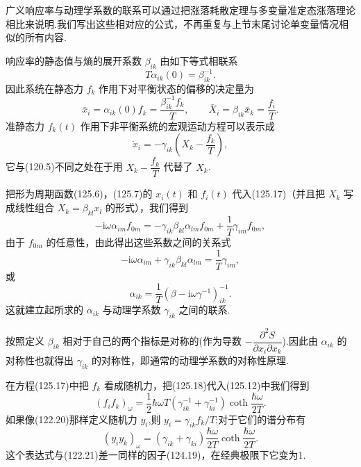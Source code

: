 广义响应率与动理学系数的联系可以通过把涨落耗散定理与多变量准定态涨落理论相比来说明.我们写出这些相对应的公式，不再重复与上节末尾讨论单变量情况相似的所有内容.

响应率的静态值与熵的展开系数 $\beta_{ik}$ 由如下等式相联系
\begin{equation*}
  T\alpha_{ik}(0)=\beta^{-1}_{ik}.
\end{equation*}
因此系统在静态力 $f_k$ 作用下对平衡状态的偏移的决定量为
\begin{equation*}
  \bar{x}_i=\alpha_{ik}(0)f_k=\frac{\beta^{-1}_{ik}f_k}{T},\qquad
  \bar{X}_i=\beta_{ik}\bar{x}_k=\frac{f_i}{T}.
\end{equation*}
准静态力 $f_k(t)$ 作用下非平衡系统的宏观运动方程可以表示成
\begin{equation}
  \dot{x}_i=-\gamma_{ik}\left(X_k-\frac{f_k}{T}\right),
\end{equation}
它与(120.5)不同之处在于用 $X_k-\dfrac{f_k}{T}$ 代替了 $X_k$.

把形为周期函数(125.6)，(125.7)的 $x_i(t)$ 和 $f_i(t)$ 代入(125.17)（并且把 $X_k$ 写成线性组合 $X_k=\beta_{kl}x_l$ 的形式），我们得到
\begin{equation*}
  -\mathrm{i}\omega\alpha_{im}f_{0m}
  =-\gamma_{ik}\beta_{kl}\alpha_{lm}f_{0m}+\frac{1}{T}\gamma_{im}f_{0m},
\end{equation*}
由于 $f_{0m}$ 的任意性，由此得出这些系数之间的关系式
\begin{equation*}
  -\mathrm{i}\omega\alpha_{im}+\gamma_{ik}\beta_{kl}\alpha_{lm}
  =\frac{1}{T}\gamma_{im},
\end{equation*}
或
\begin{equation}
  \alpha_{ik}=\frac{1}{T}(\beta-\mathrm{i}\omega\gamma^{-1})^{-1}_{ik}.
\end{equation}
这就建立起所求的 $\alpha_{ik}$ 与动理学系数 $\gamma_{ik}$ 之间的联系.

按照定义 $\beta_{ik}$ 相对于自己的两个指标是对称的(作为导数 $-\dfrac{\partial^2 S}{\partial x_i\partial x_k}$).因此由 $\alpha_{ik}$ 的对称性也就得出 $\gamma_{ik}$ 的对称性，即通常的动理学系数的对称性原理.

在方程(125.17)中把 $f_k$ 看成随机力，把(125.18)代入(125.12)中我们得到
\begin{equation*}
  (f_if_k)_\omega=\frac{1}{2}\hbar\omega T
  (\gamma^{-1}_{ik}+\gamma^{-1}_{ki})\coth\frac{\hbar\omega}{2T}.
\end{equation*}
如果像(122.20)那样定义随机力 $y_i$,则 $y_i=\gamma_{ik}f_k/T$;对于它们的谱分布有
\begin{equation}
  (y_iy_k)_\omega=(\gamma_{ik}+\gamma_{ki})\frac{\hbar\omega}{2T}
  \coth\frac{\hbar\omega}{2T}.
\end{equation}
这个表达式与(122.21)差一同样的因子(124.19)，在经典极限下它变为1.

